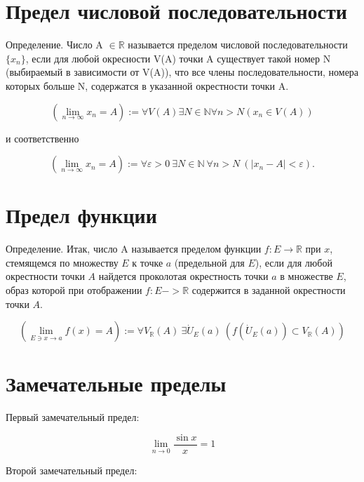 \documentclass[a4paper, 12pt]{article} %
\begin{document}
\section*{Предел числовой последовательности}
Определение. Число A $\in \mathbb{R}$ называется пределом числовой последовательности $\{x_n\}$, если для любой окресности V(A) точки A существует такой номер N (выбираемый в зависимости от V(A)), что все члены последовательности, номера которых больше N, содержатся в указанной окрестности точки A.


\begin{equation}
    (\lim_{n\to\infty} x_{n} = A) := \forall V(A) \exists N \in \mathbb{N} \forall n > N (x_n \in V(A))
\end{equation}

и соответственно

\begin{equation}
    (\lim_{n \to \infty} x_{n} = A) := \forall \varepsilon > 0 \ \exists N \in \mathbb{N} \ \forall n > N \ (|x_n - A| < \varepsilon).
\end{equation}

\clearpage

\section*{Предел функции}
Определение. Итак, число A называется пределом функции $f: E \to \mathbb{R}$ при $x$, стемящемся по множеству $E$ к точке $a$ (предельной для $E$), если для любой окрестности точки $A$ найдется проколотая окрестность точки $a$ в множестве $E$, образ которой при отображении $f : E -> \mathbb{R}$ содержится в заданной окрестности точки $A$.

\begin{equation}
    (\lim_{E \ni x \to a} f(x) = A) := \forall V_\mathbb{R}(A) \ \exists \dot{U}_E(a) \ (f(\dot{U}_E(a)) \subset V_\mathbb{R}(A))
\end{equation}

\clearpage
\section*{Замечательные пределы}

Первый замечательный предел:

\begin{equation}
    \lim_{n \to 0} \frac{\sin x}{x} = 1
\end{equation}

Второй замечательный предел:
\end{document}
